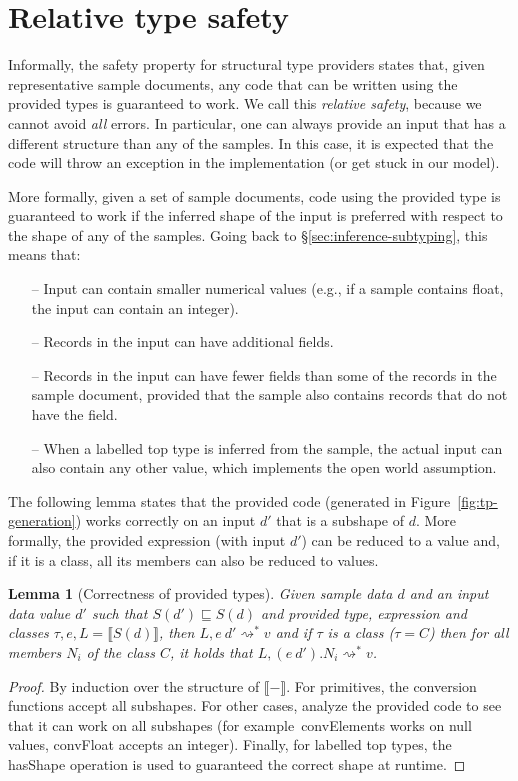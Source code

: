 \documentclass[10pt,nocopyrightspace]{sigplanconf}
\newcommand{\kvd}[1]{\textnormal{\textcolor{kvdclr}{\sffamily #1}}}
\newcommand{\ident}[1]{\textnormal{\sffamily #1}}
\newcommand{\reduce}{\rightsquigarrow}
\newcommand{\sem}[1]{\llbracket #1 \rrbracket}
\newcommand{\semalt}[1]{S(#1)}
\newtheorem{lemma}[theorem]{Lemma}
\begin{document}
\section{Relative type safety}
\label{sec:safety}

Informally, the safety property for structural type providers states that, given representative sample
documents, any code that can be written using the provided types is guaranteed to work. We call this
\emph{relative safety}, because we cannot avoid \emph{all} errors. In particular, one can always
provide an input that has a different structure than any of the samples. In this case, it is expected
that the code will throw an exception in the implementation (or get stuck in our model).

More formally, given a set of sample documents, code using the provided type is guaranteed to work if
the inferred shape of the input is preferred with respect to the shape of any of the samples. Going back to
\S\ref{sec:inference-subtyping}, this means that:
%
\begin{itemize}
\item[--] Input can contain smaller numerical values (e.g., if a sample contains float, the input can contain an integer).
\item[--] Records in the input can have additional fields.
\item[--] Records in the input can have fewer fields than some of the records in the sample
  document, provided that the sample also contains records that do not have the field.
\item[--] When a labelled top type is inferred from the sample, the actual input can also contain any other value,
  which implements the open world assumption.
\end{itemize}
%
The following lemma states that the provided code (generated in Figure~\ref{fig:tp-generation})
works correctly on an input $d'$ that is a subshape of $d$. More formally, the provided
expression (with input $d'$) can be reduced to a value and, if it is a class,
all its members can also be reduced to values.

\begin{lemma}[Correctness of provided types]
\label{thm:tp-correctness}
Given sample data $d$ and an input data value $d'$ such that $\semalt{d'} \sqsubseteq \semalt{d}$
and provided type, expression and classes $\tau, e, L = \sem{\semalt{d}}$,
then $L, e~d' \reduce^{*} v$ and if $\tau$ is a class ($\tau=C$) then for all members $N_i$ of the
class $C$, it holds that $L, (e~d').N_i \reduce^{*} v$.
\end{lemma}
\begin{proof}
By induction over the structure of $\sem{-}$. For primitives, the conversion functions accept all subshapes.
For other cases, analyze the provided code to see that it can work on all subshapes (for example~\ident{convElements}
works on \kvd{null} values, \ident{convFloat} accepts an integer). Finally, for labelled top types,
the \ident{hasShape} operation is used to guaranteed the correct shape at runtime.
\end{proof}
\end{document}
